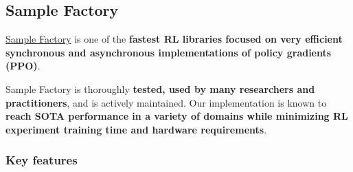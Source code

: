 \documentclass[11pt,a4paper]{article}
\begin{document}
\subsection{Sample Factory}\label{sample-factory}

\href{https://www.samplefactory.dev/}{Sample Factory} is one of the \textbf{fastest RL libraries focused on very efficient synchronous and asynchronous implementations of policy gradients (PPO)}.

Sample Factory is thoroughly \textbf{tested, used by many researchers and practitioners}, and is actively maintained. Our implementation is known to \textbf{reach SOTA performance in a variety of domains while minimizing RL experiment training time and hardware requirements}.


\subsubsection{Key features}\label{key-features}
\end{document}
